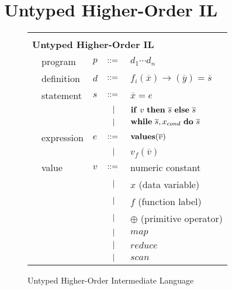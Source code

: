 \documentclass[preprint]{sigplanconf}
\begin{document}
\maketitle
\section{Untyped Higher-Order IL}
\begin{figure}[h!]
  \begin{tabular}{| m{0.01cm}m{1.5cm}m{0.1cm}m{0.2cm}p{4.5cm} |}
  \hline
  & & & &\\ 
   \multicolumn{5}{|l|}{\textbf{Untyped Higher-Order IL}}  \\[4pt]
  & program & $p$ &  $::=$   &  $d_1 \cdots d_n $ \\[4pt]
  & definition & $d$ & $::=$ & $f_i(\overline{x}) \rightarrow (\overline{y}) = \overline{s}$ \\[4pt]
  & statement  & $s$ & $::=$ & $\overline{x} = e $\\[2pt]
  &            &     & $\ \ | \ \ $    & $\mbox{\textbf{if}} ~v~ \mbox{\textbf{then}} ~ \overline{s} ~ \mbox{\textbf{else}} ~ \overline{s} $ \\[2pt]
  &            &     & $\ \ | \ \ $    & $\mbox{\textbf{while}} ~\overline{s}, x_{cond} ~ \mbox{\textbf{do}} ~\overline{s}~ $  \\[5pt]
  & expression & $e$ & $::=$ & $\mbox{\textbf{values}} (\overline{v})$ \\[2pt]
  &            &     & $\ \ | \ \ $    & $ v_f (\overline{v}) $ \\[9pt]
  & value      & $v$ & $::=$ & numeric constant\\[2pt]
  &            &     & $\ \ | \ \ $    &  $x$  \quad \small{(data variable)} \\[2pt]
  &            &     & $\ \ | \ \ $    &  $f$  \quad \small{(function label)} \\[2pt]
  &            &     & $\ \ | \ \ $    &  $\oplus$ \quad \small{(primitive operator)} \\[2pt]
  &            &     & $\ \ | \ \ $    & $map$\\[2pt]
  &            &     & $\ \ | \ \ $    & $reduce$ \\[2pt]
  &            &     & $\ \ | \ \ $    & $scan$\\[5pt]
  \hline
  \end{tabular}
\caption{Untyped Higher-Order Intermediate Language}
\end{figure}
\end{document}
